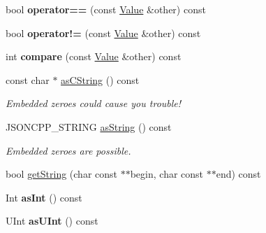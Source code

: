 \begin{DoxyCompactItemize}
\item 
bool {\bfseries operator==} (const \hyperlink{class_json_1_1_value}{Value} \&other) const \hypertarget{class_json_1_1_value_a14363dda23a6ae2def9afd1590ae85d3}{}\label{class_json_1_1_value_a14363dda23a6ae2def9afd1590ae85d3}

\item 
bool {\bfseries operator!=} (const \hyperlink{class_json_1_1_value}{Value} \&other) const \hypertarget{class_json_1_1_value_ad0f12d2a4ab74bbef08a05504b2cb81d}{}\label{class_json_1_1_value_ad0f12d2a4ab74bbef08a05504b2cb81d}

\item 
int {\bfseries compare} (const \hyperlink{class_json_1_1_value}{Value} \&other) const \hypertarget{class_json_1_1_value_a899214ed2253d3f4f061b922b0e622b5}{}\label{class_json_1_1_value_a899214ed2253d3f4f061b922b0e622b5}

\item 
const char $\ast$ \hyperlink{class_json_1_1_value_a5b7da48b163bcec63b1424f1608b7da6}{as\+C\+String} () const \hypertarget{class_json_1_1_value_a5b7da48b163bcec63b1424f1608b7da6}{}\label{class_json_1_1_value_a5b7da48b163bcec63b1424f1608b7da6}

\begin{DoxyCompactList}\small\item\em Embedded zeroes could cause you trouble! \end{DoxyCompactList}\item 
J\+S\+O\+N\+C\+P\+P\+\_\+\+S\+T\+R\+I\+NG \hyperlink{class_json_1_1_value_a0f9b76085072127a228206c8e616dcbc}{as\+String} () const \hypertarget{class_json_1_1_value_a0f9b76085072127a228206c8e616dcbc}{}\label{class_json_1_1_value_a0f9b76085072127a228206c8e616dcbc}

\begin{DoxyCompactList}\small\item\em Embedded zeroes are possible. \end{DoxyCompactList}\item 
bool \hyperlink{class_json_1_1_value_a1e0263113ae247a632afac43ebc4149f}{get\+String} (char const $\ast$$\ast$begin, char const $\ast$$\ast$end) const 
\item 
Int {\bfseries as\+Int} () const \hypertarget{class_json_1_1_value_ac786e35b860b1d700cb3d3e56dd6a235}{}\label{class_json_1_1_value_ac786e35b860b1d700cb3d3e56dd6a235}

\item 
U\+Int {\bfseries as\+U\+Int} () const \hypertarget{class_json_1_1_value_a2019d1bd296b89356c1b0da5970c918c}{}\label{class_json_1_1_value_a2019d1bd296b89356c1b0da5970c918c}


\end{DoxyCompactItemize}
